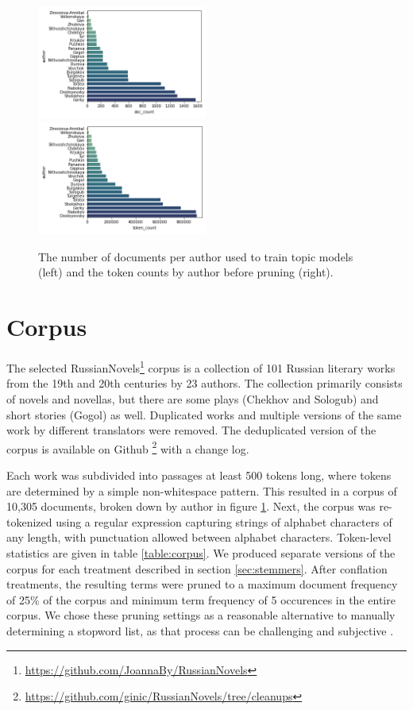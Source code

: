 \documentclass[11pt,a4paper]{article}
\begin{document}
\begin{figure}[t]
    \includegraphics[width=0.5\textwidth]{document_count_by_author.png}
    \includegraphics[width=0.5\textwidth]{token_count_by_author.png}
    \caption{The number of documents per author used to train topic models (left) and the token counts by author before pruning (right).}
    \label{fig:docsByAuthor}
\end{figure}


\section{Corpus}
The selected RussianNovels\footnote{\url{https://github.com/JoannaBy/RussianNovels}} corpus is a collection of 101 Russian literary works from the 19th and 20th centuries by 23 authors. The collection primarily consists of novels and novellas, but there are some plays (Chekhov and Sologub) and short stories (Gogol) as well. Duplicated works and multiple versions of the same work by different translators were removed. The deduplicated version of the corpus is available on Github \footnote{\url{https://github.com/ginic/RussianNovels/tree/cleanups}} with a change log.

Each work was subdivided into passages at least 500 tokens long, where tokens are determined by a simple non-whitespace pattern. This resulted in a corpus of 10,305 documents, broken down by author in figure \ref{fig:docsByAuthor}. Next, the corpus was re-tokenized using a regular expression capturing strings of alphabet characters of any length, with punctuation allowed between alphabet characters. Token-level statistics are given in table \ref{table:corpus}. We produced separate versions of the corpus for each treatment described in section \ref{sec:stemmers}. After conflation treatments, the resulting terms were pruned to a maximum document frequency of 25\% of the corpus and minimum term frequency of 5 occurences in the entire corpus. We chose these pruning settings as a reasonable alternative to manually determining a stopword list, as that process can be challenging and subjective \cite{schofield-etal-2017-pulling}.
\end{document}
